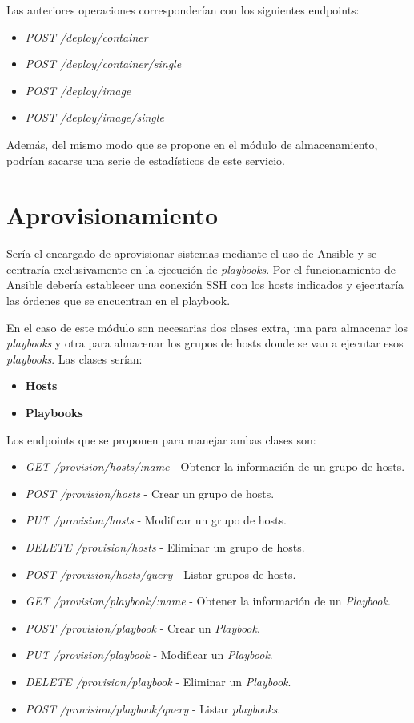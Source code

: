 \bigskip
Las anteriores operaciones corresponderían con los siguientes endpoints:
\begin{itemize}
	\item \textit{POST /deploy/container}
	\item \textit{POST /deploy/container/single}
	\item \textit{POST /deploy/image}
	\item \textit{POST /deploy/image/single}
\end{itemize}


\bigskip
Además, del mismo modo que se propone en el módulo de almacenamiento, podrían sacarse una serie de estadísticos de este servicio.





\section{Aprovisionamiento}
Sería el encargado de aprovisionar sistemas mediante el uso de Ansible y se centraría exclusivamente en la ejecución de \textit{playbooks}. Por el funcionamiento de Ansible debería establecer una conexión SSH con los hosts indicados y ejecutaría las órdenes que se encuentran en el playbook.

\bigskip
En el caso de este módulo son necesarias dos clases extra, una para almacenar los \textit{playbooks} y otra para almacenar los grupos de hosts donde se van a ejecutar esos \textit{playbooks}. Las clases serían:
\begin{itemize}
	\item \textbf{Hosts}
	\item \textbf{Playbooks}
\end{itemize}


Los endpoints que se proponen para manejar ambas clases son:
\begin{itemize}
	\item \textit{GET /provision/hosts/:name} - Obtener la información de un grupo de hosts.
	\item \textit{POST /provision/hosts} - Crear un grupo de hosts.
	\item \textit{PUT /provision/hosts} - Modificar un grupo de hosts.
	\item \textit{DELETE /provision/hosts} - Eliminar un grupo de hosts.
	\item \textit{POST /provision/hosts/query} - Listar grupos de hosts.
	\item \textit{GET /provision/playbook/:name} - Obtener la información de un \textit{Playbook}.
	\item \textit{POST /provision/playbook} - Crear un \textit{Playbook}.
	\item \textit{PUT /provision/playbook} - Modificar un \textit{Playbook}.
	\item \textit{DELETE /provision/playbook} - Eliminar un \textit{Playbook}.
	\item \textit{POST /provision/playbook/query} - Listar \textit{playbooks}.
\end{itemize}


